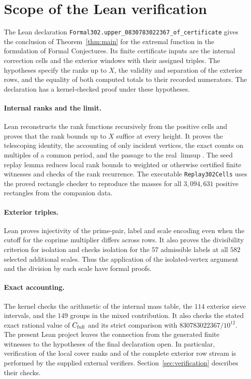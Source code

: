 \documentclass[11pt,letterpaper]{article}
\theoremstyle{definition}
\newcommand{\cfull}{C_{\rm full}}
\begin{document}
\section{Scope of the Lean verification}\label{sec:lean}
The Lean declaration \verb|Formal302.upper_0830783022367_of_certificate|
gives the conclusion of Theorem~\ref{thm:main} for the extremal function
in the formulation of Formal Conjectures. Its finite certificate inputs
are the internal correction cells and the exterior windows with their
assigned triples. The hypotheses specify the ranks up to $X$, the
validity and separation of the exterior rows, and the equality of
both computed totals to their recorded numerators. The declaration
has a kernel-checked proof under these hypotheses.

\paragraph{Internal ranks and the limit.}
Lean reconstructs the rank functions recursively from the positive
cells and proves that the rank bounds up to $X$ suffice at every
height. It proves the telescoping identity, the accounting of only
incident vertices, the exact counts on multiples of a common period,
and the passage to the real $\limsup$. The seed replay lemma reduces
local rank bounds to weighted or otherwise certified finite witnesses
and checks of the rank recurrence. The executable \verb|Replay302Cells|
uses the proved rectangle checker to reproduce the masses for all
$3{,}094{,}631$ positive rectangles from the companion data.

\paragraph{Exterior triples.}
Lean proves injectivity of the prime-pair, label and scale encoding
even when the cutoff for the coprime multiplier differs across rows.
It also proves the divisibility criterion for isolation and checks
isolation for the $57$ admissible labels at all $582$ selected
additional scales. Thus the application of the isolated-vertex
argument and the division by each scale have formal proofs.

\paragraph{Exact accounting.}
The kernel checks the arithmetic of the internal mass table, the
$114$ exterior sieve intervals, and the $149$ groups in the mixed
contribution. It also checks the stated exact rational value of
$\cfull$ and its strict comparison with $830783022367/10^{12}$.
The present Lean project leaves the connection from the generated
finite witnesses to the hypotheses of the final declaration open.
In particular, verification of the local cover ranks and of the
complete exterior row stream is performed by the supplied external
verifiers. Section~\ref{sec:verification} describes their checks.
\end{document}
